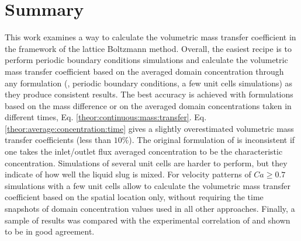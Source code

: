 \documentclass{article}
\newcommand{\beq}{\begin{equation}}
\newcommand{\feq}{\end{equation}}
\newcommand{\cstar}{C^{*}}
\begin{document}
\section{Summary}
This work examines a way to calculate the volumetric mass transfer coefficient in the framework of
the lattice Boltzmann method. Overall, the easiest recipe is to perform periodic boundary
conditions simulations and calculate the volumetric mass transfer coefficient based on the averaged
domain concentration through any formulation (\citeauthor{vanbaten-circular}, periodic boundary conditions, a few unit cells simulations) as they produce consistent results. The best accuracy
is achieved with formulations based on the mass difference or on the averaged domain concentrations
taken in different times, Eq. \ref{theor:continuous:mass:transfer}. Eq.
\ref{theor:average:concentration:time} gives a slightly overestimated volumetric mass transfer
coefficients (less than $10\%$). The original formulation of
\citet{vanbaten-circular} is inconsistent if one takes the inlet/outlet flux averaged concentration
to be the characteristic concentration. Simulations of several unit cells are harder to perform, but they
indicate of how well the liquid slug is mixed.  For velocity patterns of $Ca\geq
0.7$ simulations with a few unit cells allow to calculate the volumetric mass transfer
coefficient based on the spatial location only, without requiring the time snapshots of domain concentration values used in all other
approaches. Finally, a sample of results was
compared with the experimental correlation of \citet{yue-mass} and shown to be in good agreement. 
\appendix
\end{document}
